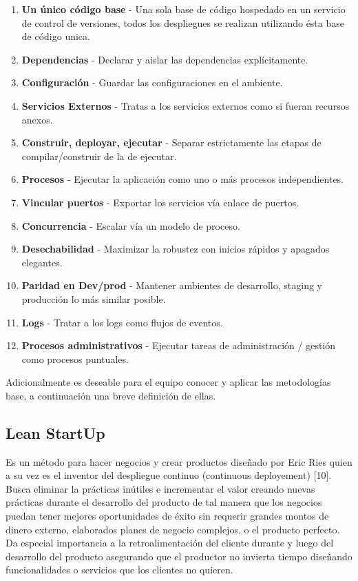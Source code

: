 \documentclass[conference]{IEEEtran}
\begin{document}
\begin{enumerate}
 \item {\bf Un único código base} - Una sola base de código hospedado en un servicio de control de versiones, todos los despliegues se realizan utilizando ésta base de código unica.
 \item {\bf Dependencias} - Declarar y aislar las dependencias explícitamente.
 \item {\bf Configuración} - Guardar las configuraciones en el ambiente.
 \item {\bf Servicios Externos} - Tratas a los servicios externos como si fueran recursos anexos.
 \item {\bf Construir, deployar, ejecutar} - Separar estrictamente las etapas de compilar/construir de la de ejecutar.
 \item {\bf Procesos} - Ejecutar la aplicación como uno o más procesos independientes.
 \item {\bf Vincular puertos} - Exportar los servicios vía enlace de puertos.
 \item {\bf Concurrencia} - Escalar vía un modelo de proceso.
 \item {\bf Desechabilidad} - Maximizar la robustez con inicios rápidos y apagados elegantes.
 \item {\bf Paridad en Dev/prod} - Mantener ambientes de desarrollo, staging y producción lo más similar posible.
 \item {\bf Logs} - Tratar a los logs como flujos de eventos.
 \item {\bf Procesos administrativos} - Ejecutar tareas de administración / gestión como procesos puntuales.
\end{enumerate}

Adicionalmente es deseable para el equipo conocer y aplicar las metodologías base, a continuación una breve definición de ellas.

\subsection{Lean StartUp}

Es un método para hacer negocios y crear productos diseñado por Eric Ries quien a su vez es el inventor del despliegue continuo (continuous deployement) [10]. Busca eliminar la prácticas inútiles e incrementar el valor creando nuevas prácticas durante el desarrollo del producto de tal manera que los negocios puedan tener mejores oportunidades de éxito sin requerir grandes montos de dinero externo, elaborados planes de negocio complejos, o el producto perfecto. Da especial importancia a la retroalimentación del cliente durante y luego del desarrollo del producto asegurando que el productor no invierta tiempo diseñando funcionalidades o servicios que los clientes no quieren.
\end{document}
